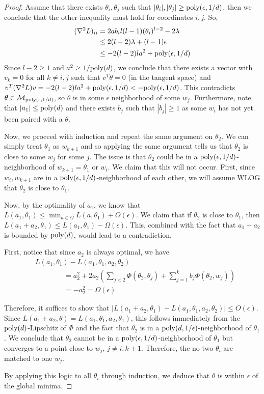 \documentclass{article}
\begin{document}
\begin{proof}
Assume that there exists $\theta_i, \theta_j$ such that $|\theta_i|,|\theta_j| \geq \mathrm{poly}(\epsilon,1/d)$, then we conclude that the other inequality must hold for coordinates $i, j$. So,
%
\begin{align*}
(\nabla^2 L)_{ii} & = 2a b_i l(l-1)(\theta_i)^{l-2} - 2 \lambda \\
& \leq
  2(l-2)\lambda + (l-1)\epsilon \\
&  \leq -2(l-2)la^2 + \mathrm{poly}(\epsilon,1/d)
\end{align*}
%
Since $l-2 \geq 1$ and $a^2 \geq 1/\mathrm{poly}(d)$, we conclude that there
exists a vector with $v_k = 0$ for all $k\neq i, j$ such that
$v^T\theta = 0$ (in the tangent space) and
$v^T(\nabla^2 L) v = -2(l-2)l a^2 + \mathrm{poly}(\epsilon,1/d) <
-\mathrm{poly}(\epsilon,1/d)$.
This contradicts $\theta \in \mathcal{M}_{\mathrm{poly}(\epsilon,1/d)}$, so
$\theta$ is in some $\epsilon$ neighborhood of some
$w_j$. Furthermore, note that $|a_1| \leq \mathrm{poly}(d)$ and there exists
$b_j$ such that $|b_j| \geq 1$ as some $w_i$ has not yet been paired
with a $\theta$.

Now, we proceed with induction and repeat the same argument on $\theta_2$. We can simply treat $\theta_1$ as $w_{k+1}$ and so applying the same argument tells us that $\theta_2$ is close to some $w_j$ for some $j$. The issue is that $\theta_2$ could be in a $\mathrm{poly}(\epsilon,1/d)$-neighborhood of $w_{k+1} = \theta_1$ or $w_i$. We claim that this will not occur. First, since $w_i, w_{k+1}$ are in a $\mathrm{poly}(\epsilon,1/d)$-neighborhood of each other, we will assume WLOG that $\theta_2$ is close to $\theta_1$.

Now, by the optimality of $a_1$, we know that $L(a_1,\theta_1) \leq \min_{a \in \Omega} L(a,\theta_1) + O(\epsilon)$. We claim that if $\theta_2$ is close to $\theta_1$, then $L(a_1+a_2,\theta_1) \leq L(a_1,\theta_1) - \Omega(\epsilon)$. This, combined with the fact that $a_1 + a_2$ is bounded by $\mathrm{poly}(d)$, would lead to a contradiction.

First, notice that since $a_2$ is always optimal, we have
\begin{align*}
& L(a_1,\theta_1) - L(a_1,\theta_1,a_2,\theta_2) \\
& \qquad \qquad = a_2^2 + 2a_2 (\sum_{j < 2} \Phi(\theta_2,\theta_j) + \sum_{j=1}^k b_j \Phi(\theta_2,w_j)) \\
& \qquad \qquad = -a_2^2 = \Omega(\epsilon)
\end{align*}

Therefore, it suffices to show that $|L(a_1+a_2,\theta_1) - L(a_1,\theta_1,a_2,\theta_2) | \leq O(\epsilon)$. Since $L(a_1+a_2,\theta) = L(a_1,\theta_1,a_2,\theta_1)$, this follows immediately from the $\mathrm{poly}(d)$-Lipschitz of $\Phi$ and the fact that $\theta_2$ is in a $\mathrm{poly}(d,1/\epsilon)$-neighborhood of $\theta_1$. We conclude that $\theta_2$ cannot be in a $\mathrm{poly}(\epsilon,1/d)$-neighborhood of $\theta_1$ but converges to a point close to $w_{j}$, $j\neq i,k+1$. Therefore, the no two $\theta_i$ are matched to one $w_j$. 

By applying this logic to all $\theta_i$ through induction, we deduce that $\theta$ is within $\epsilon$ of the global minima.
\end{proof}
\end{document}
